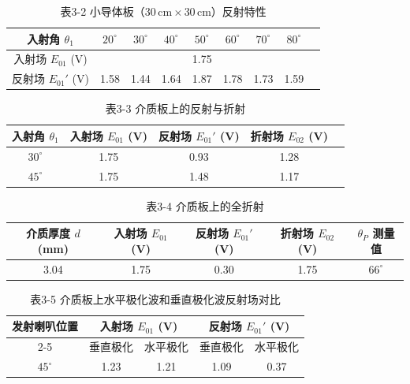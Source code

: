 \documentclass{../ElectromagneticFieldTemplate}
\begin{document}
\begin{table}[H]
    \centering
    \caption{表3-2 小导体板（\(30\,\text{cm} \times 30\,\text{cm}\)）反射特性}
    \renewcommand{\arraystretch}{1.3}
    \begin{tabular}{|c|c|c|c|c|c|c|c|c|}
        \hline
        入射角 \(\theta_1\) & \(20^\circ\) & \(30^\circ\) & \(40^\circ\) & \(50^\circ\) & \(60^\circ\) & \(70^\circ\) & \(80^\circ\) \\
        \hline
        入射场 \(E_{01}\) (V) & \multicolumn{7}{c|}{1.75} \\
        \hline
        反射场 \(E_{01}'\) (V) & 1.58 & 1.44 & 1.64 & 1.87 & 1.78 & 1.73 & 1.59 \\
        \hline
    \end{tabular}
\end{table}

\begin{table}[H]
    \centering
    \caption{表3-3 介质板上的反射与折射}
    \renewcommand{\arraystretch}{1.3}
    \begin{tabular}{|c|c|c|c|c|}
        \hline
        入射角 \(\theta_1\) & 入射场 \(E_{01}\) (V) & 反射场 \(E_{01}'\) (V) & 折射场 \(E_{02}\) (V) \\
        \hline
        \(30^\circ\) & 1.75 & 0.93 & 1.28 \\
        \hline
        \(45^\circ\) & 1.75 & 1.48 & 1.17 \\
        \hline
    \end{tabular}
\end{table}

\begin{table}[H]
    \centering
    \caption{表3-4 介质板上的全折射}
    \renewcommand{\arraystretch}{1.3}
    \begin{tabular}{|c|c|c|c|c|}
        \hline
        介质厚度 \(d\) (mm) & 入射场 \(E_{01}\) (V) & 反射场 \(E_{01}'\) (V) & 折射场 \(E_{02}\) (V) & \(\theta_P\) 测量值 \\
        \hline
        3.04 & 1.75 & 0.30 & 1.75 & \(66^\circ\) \\
        \hline
    \end{tabular}
\end{table}

\begin{table}[H]
    \centering
    \caption{表3-5 介质板上水平极化波和垂直极化波反射场对比}
    \renewcommand{\arraystretch}{1.3}
    \begin{tabular}{|c|c|c|c|c|}
        \hline
        发射喇叭位置 & \multicolumn{2}{c|}{入射场 \(E_{01}\) (V)} & \multicolumn{2}{c|}{反射场 \(E_{01}'\) (V)} \\
        \cline{2-5}
         & 垂直极化 & 水平极化 & 垂直极化 & 水平极化 \\
        \hline
        \(45^\circ\) & 1.23 & 1.21 & 1.09 & 0.37 \\
        \hline
    \end{tabular}
\end{table}
\end{document}
